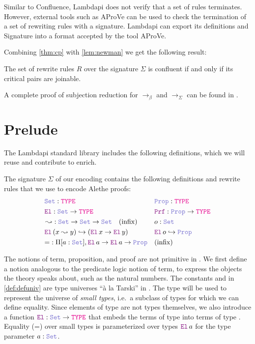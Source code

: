\begin{remark}
Similar to Confluence, Lambdapi does not verify that a set of rules terminates.
However, external tools such as AProVe \cite{aprove} can be used to check the termination of a set of rewriting rules with a signature.
Lambdapi can export its definitions and Signature into a format accepted by the tool AProVe.
\end{remark}

Combining \cref{thm:cp} with \cref{lem:newman} we get the following result:

\begin{corollary}
The set of rewrite rules $R$ over the signature $\Sigma$ is confluent if and only if its critical pairs are joinable.
\end{corollary}

A complete proof of subjection reduction for $\longrightarrow_\beta$ and $\longrightarrow_\Sigma$ can be found in \cite[\S 2.6.4]{Dedukti-ref2}.

\section{Prelude}
\label{sec:prelude-lp}

The Lambdapi standard library includes the following definitions, which we will reuse and contribute to enrich.

\begin{definition}
\label{def:defuniv}
The signature $\Sigma$ of our encoding contains the following definitions and rewrite rules that we use to encode Alethe proofs:
\begin{align*}
&\set\index{\set}: \type & &\prop\index{\prop}: \type \\
&\index{\el{}} \el{}: \set \rightarrow \type  & &\index{\prf}\prf{} : \prop \rightarrow \type \\
&\mathop{\leadsto}\index{$\leadsto$}: \set \rightarrow \set \rightarrow \set \quad \text{(infix)} & &o: \set \\
&\el\,(x \leadsto y) \hookrightarrow (\el\,x \rightarrow \el\,y) & &\el\,o\index{o}  \hookrightarrow \prop \\
& {=} : \Pi [a : \set], \el\, a \ra \el\, a \ra \prop & & \text{(inﬁx)}
\end{align*}
\end{definition}

The notions of term, proposition, and proof are not primitive in \lpm.
We ﬁrst deﬁne a notion analogous to the predicate logic notion of term, to express the objects the theory speaks about, such as the natural numbers.
The constants \set{} and \prop{} in \cref{def:defuniv} are type universes ``à la Tarski'' \cite[\S Universes]{intuitype} in \lpm.
The type \set{} will be used to represent the universe of \textit{small types}, i.e.\ a subclass of types for which we can define equality.
Since elements of type \set{} are not types themselves,
we also introduce a function $\el: \set \rightarrow \type$ that embeds the terms of type \set{} into terms of type \type.
Equality (=) over small types is parameterized over types $\el\,a$ for the type parameter $a : \set{}$.

